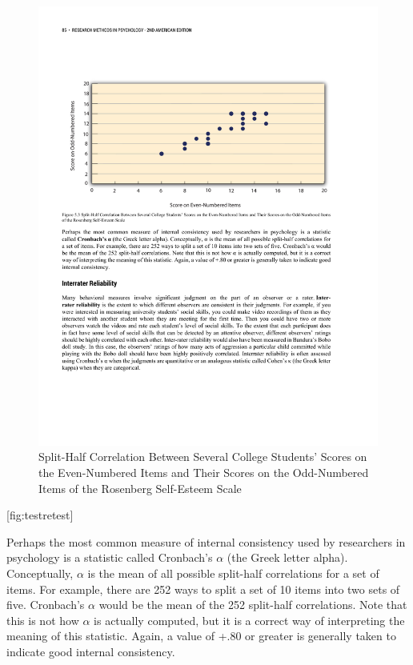 \documentclass[]{book}
\theoremstyle{definition}
\theoremstyle{definition}
\theoremstyle{remark}
\begin{document}
\begin{figure}[htbp]
\centering
\includegraphics{figures/C5internal.pdf}
\caption{Split-Half Correlation Between Several College Students' Scores
on the Even-Numbered Items and Their Scores on the Odd-Numbered Items of
the Rosenberg Self-Esteem Scale}
\end{figure}

{[}fig:testretest{]}

Perhaps the most common measure of internal consistency used by
researchers in psychology is a statistic called Cronbach's \(\alpha\)
(the Greek letter alpha). Conceptually, \(\alpha\) is the mean of all
possible split-half correlations for a set of items. For example, there
are 252 ways to split a set of 10 items into two sets of five.
Cronbach's \(\alpha\) would be the mean of the 252 split-half
correlations. Note that this is not how \(\alpha\) is actually computed,
but it is a correct way of interpreting the meaning of this statistic.
Again, a value of +.80 or greater is generally taken to indicate good
internal consistency.
\end{document}
